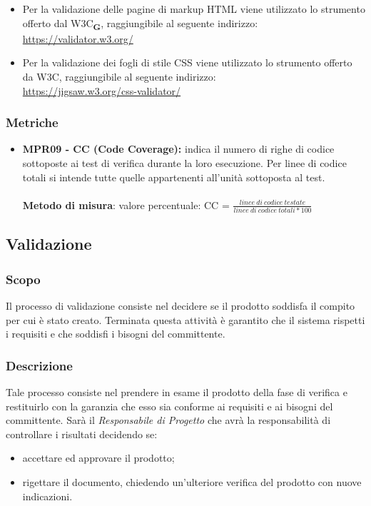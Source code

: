 \begin{itemize}
    \item Per la validazione delle pagine di markup HTML viene utilizzato lo strumento offerto dal W3C\textsubscript{\textbf{G}}, raggiungibile al seguente indirizzo:\\
          \href{https://validator.w3.org/}{https://validator.w3.org/}
    \item Per la validazione dei fogli di stile CSS viene utilizzato lo strumento offerto da W3C, raggiungibile al seguente indirizzo:\\
          \href{https://jigsaw.w3.org/css-validator/}{https://jigsaw.w3.org/css-validator/}

\end{itemize}

\subsubsection{Metriche}
\begin{itemize}
    \item \textbf{MPR09 - CC (Code Coverage):} indica il numero di righe di codice sottoposte ai test di verifica durante la loro esecuzione. Per linee di codice totali
          si intende tutte quelle appartenenti all'unità sottoposta al test.\\
          \\\textbf{Metodo di misura}: valore percentuale: CC = $\frac{linee \ di \ codice \ testate}{linee \ di \ codice \ totali * 100}$
\end{itemize}

\subsection{Validazione}
\subsubsection{Scopo}
Il processo di validazione consiste nel decidere se il prodotto soddisfa il compito per cui è stato creato. Terminata questa attività è
garantito che il sistema rispetti i requisiti e che soddisfi i bisogni del committente.
\subsubsection{Descrizione}
Tale processo consiste nel prendere in esame il prodotto della fase di verifica e restituirlo con la garanzia che esso sia
conforme ai requisiti e ai bisogni del committente.
Sarà il \textit{Responsabile di Progetto} che avrà la responsabilità di controllare i risultati decidendo se:
\begin{itemize}
    \item accettare ed approvare il prodotto;
    \item rigettare il documento, chiedendo un'ulteriore verifica del prodotto con nuove indicazioni.
\end{itemize}

